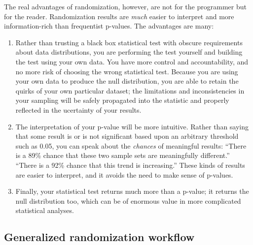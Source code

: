 \documentclass[
]{book}
\begin{document}
The real advantages of randomization, however, are not for the programmer but for the reader. Randomization results are \emph{much} easier to interpret and more information-rich than frequentist p-values. The advantages are many:

\begin{enumerate}
\def\labelenumi{\arabic{enumi}.}
\item
  Rather than trusting a black box statistical test with obscure requirements about data distributions, you are performing the test yourself and building the test using your own data. You have more control and accountability, and no more risk of choosing the wrong statistical test. Because you are using your own data to produce the null distribution, you are able to retain the quirks of your own particular dataset; the limitations and inconsistencies in your sampling will be safely propagated into the statistic and properly reflected in the ucertainty of your results.
\item
  The interpretation of your p-value will be more intuitive. Rather than saying that some result is or is not significant based upon an arbitrary threshold such as 0.05, you can speak about the \emph{chances} of meaningful results: ``There is a 89\% chance that these two sample sets are meaningfully different.'' ``There is a 92\% chance that this trend is increasing.'' These kinds of results are easier to interpret, and it avoids the need to make sense of p-values.
\item
  Finally, your statistical test returns much more than a p-value; it returns the null distribution too, which can be of enormous value in more complicated statistical analyses.
\end{enumerate}

\hypertarget{generalized-randomization-workflow}{%
\subsection*{Generalized randomization workflow}\label{generalized-randomization-workflow}}
\end{document}
